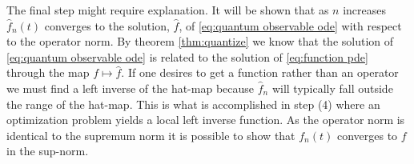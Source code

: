 \documentclass[12pt]{amsart}
\begin{document}
\begin{center}
\end{center}

The final step might require explanation.
It will be shown that as $n$ increases $\hat{f}_{n}(t)$ converges to the solution, $\hat{f}$, of \eqref{eq:quantum observable ode} with respect to the operator norm.
By theorem \eqref{thm:quantize} we know that the solution of \eqref{eq:quantum observable ode} is related to the solution of \eqref{eq:function pde}
through the map $f \mapsto \hat{f}$.
If one desires to get a function rather than an operator we must find a left inverse of the hat-map because $\hat{f}_{n}$ will typically fall outside the range of the hat-map.
This is what is accomplished in step (4) where an optimization problem yields a local left inverse function.
As the operator norm is identical to the supremum norm it is possible to show that $f_{n}(t)$ converges to $f$ in the sup-norm.
\end{document}
